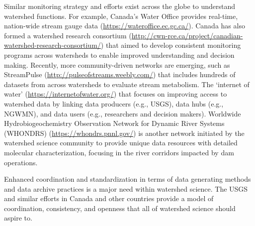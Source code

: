 \documentclass[preprint,review, 12pt]{elsarticle}
\providecommand{\DIFadd}[1]{{\protect\color{blue}\uwave{#1}}} %
\providecommand{\DIFaddbegin}{} %
\providecommand{\DIFaddend}{} %
\newcommand{\DIFaddincludegraphics}[2][]{{\color{blue}\fbox{\DIFOincludegraphics[#1]{#2}}}} %
\DeclareRobustCommand{\DIFaddbegin}{\DIFOaddbegin \let\includegraphics\DIFaddincludegraphics} %
\DeclareRobustCommand{\DIFaddend}{\DIFOaddend \let\includegraphics\DIFOincludegraphics} %
\begin{document}
\begin{sloppypar}
Similar monitoring strategy and efforts exist across the globe to understand watershed functions. For example, Canada’s Water Office provides real-time, nation-wide stream gauge data (\url{https://wateroffice.ec.gc.ca/}). Canada has also formed a watershed research consortium (\url{http://cwn-rce.ca/project/canadian-watershed-research-consortium/}) that aimed to develop consistent monitoring programs across watersheds to enable improved understanding and decision making. Recently, more community-driven networks are emerging, such as StreamPulse (\url{http://pulseofstreams.weebly.com/}) that includes hundreds of datasets from across watersheds to evaluate stream metabolism.  The ‘internet of water’ (\url{https://internetofwater.org/}) that focuses on improving access to watershed data by linking data producers (e.g., USGS), data hubs (e.g., NGWMN), and data users (e.g., researchers and decision makers). Worldwide Hydrobiogeochemistry Observation Network for Dynamic River Systems (WHONDRS) (\url{https://whondrs.pnnl.gov/}) \DIFaddbegin \DIFadd{\mbox{%
\citep{stegen_whondrs_2018} }\hspace{0pt}%
}\DIFaddend is another network initiated by the watershed science community to provide unique data resources with detailed molecular characterization, focusing in the river corridors impacted by dam operations.
\end{sloppypar}

Enhanced coordination and standardization in terms of data generating methods and data archive practices is a major need within watershed science. The USGS and similar efforts in Canada and other countries provide a model of coordination, consistency, and openness that all of watershed science should aspire to.

\end{document}
